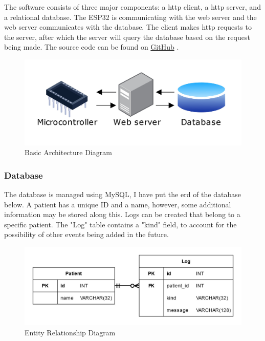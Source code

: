 The software consists of three major components: a \gls{http} client, a \gls{http} server, and a relational database.
The ESP32 is communicating with the web server and the web server communicates with the database.
The client makes \gls{http} requests to the server, after which the server will query the database based on the request being made.
The source code can be found on \href{https://github.com/jochemarends/project-integration/tree/main/final-assignment}{GitHub} \cite{github-final-assignment}.

\begin{figure}[H]
    \begin{center}
    \includegraphics[width=\textwidth]{images/architecture-diagram}
    \end{center}
    \caption{Basic Architecture Diagram}
\end{figure}

\subsubsection{Database}

The database is managed using MySQL, I have put the \gls{erd} of the database below.
A patient has a unique ID and a name, however, some additional information may be stored along this.
Logs can be created that belong to a specific patient.
The "Log" table contains a "kind" field, to account for the possibility of other events being added in the future.

\begin{figure}[H]
    \includegraphics[width=\linewidth]{images/erd}
    \caption{Entity Relationship Diagram}
\end{figure}

